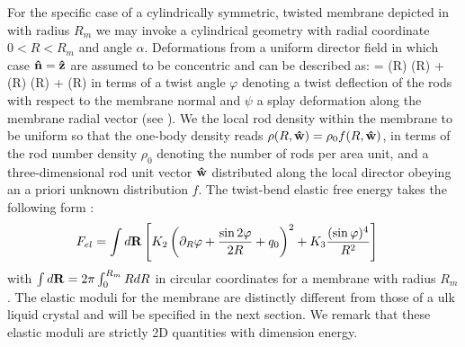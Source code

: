  For the specific case of a cylindrically symmetric, twisted membrane depicted in
  with radius $R_{m}$ we may invoke a cylindrical geometry  with radial coordinate $0<R< R_{m}$ and angle $\alpha$.  Deformations from a uniform director field in which case ${\bf \hat{n}} = {\bf \hat{z}}$ are assumed to be concentric and can be described as:
 \beq
 \bn = \cos \psi (R) \cos  \varphi(R) \bz + \cos \psi (R) \sin \varphi(R) \bal + \sin \psi(R) \bars
 \label{tilt}
 \eeq
in terms of a twist angle  $ \varphi $ denoting a twist deflection of the rods with respect to the membrane normal and $\psi$ a splay deformation along the membrane radial vector (see ).   We the local rod density within the membrane to be uniform so that the one-body density reads $\rho(R, {\bf \hat{w}})  = \rho_{0}f(R,  {\bf \hat{w}})$, in terms of the rod number density $\rho_{0}$ denoting the number of rods per area unit, and a three-dimensional rod unit vector ${\bf \hat{w}}$ distributed along the local director obeying an a priori unknown distribution $f$. The twist-bend elastic free energy  takes the following form \cite{barry_jpcb2009,wensink2018elastic}:
\begin{align}
 F_{el}  &= \int  d {\bf R} \left [ K_{2} \left ( \partial_{R} \varphi + \frac{\sin 2 \varphi}{2R} + q_{0} \right )^{2}  + K_{3}\frac{ ( \sin \varphi )^{4}}{R^{2}} \right   ]
\label{fmem}
\end{align}
with $\int d {\bf R} = 2 \pi \int_{0}^{R_{m}} R dR $ in circular coordinates for a membrane with radius $R_{m}$.
 The  elastic moduli for the membrane are distinctly different from those of a ulk liquid crystal and will be specified in the next section. We remark that these elastic moduli are strictly 2D quantities with dimension energy.  


